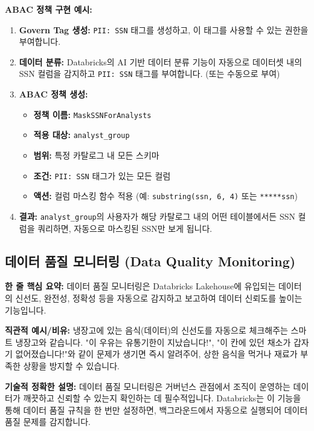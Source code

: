 \documentclass[11pt,a4paper]{article}
\begin{document}
\begin{examplebox}
\textbf{ABAC 정책 구현 예시:}
\begin{enumerate}
    \item \textbf{Govern Tag 생성:} \texttt{PII: SSN} 태그를 생성하고, 이 태그를 사용할 수 있는 권한을 부여합니다.
    \item \textbf{데이터 분류:} Databricks의 AI 기반 데이터 분류 기능이 자동으로 데이터셋 내의 SSN 컬럼을 감지하고 \texttt{PII: SSN} 태그를 부여합니다. (또는 수동으로 부여)
    \item \textbf{ABAC 정책 생성:}
    \begin{itemize}
        \item \textbf{정책 이름:} \texttt{MaskSSNForAnalysts}
        \item \textbf{적용 대상:} \texttt{analyst\_group}
        \item \textbf{범위:} 특정 카탈로그 내 모든 스키마
        \item \textbf{조건:} \texttt{PII: SSN} 태그가 있는 모든 컬럼
        \item \textbf{액션:} 컬럼 마스킹 함수 적용 (예: \texttt{substring(ssn, 6, 4)} 또는 \texttt{*****ssn})
    \end{itemize}
    \item \textbf{결과:} \texttt{analyst\_group}의 사용자가 해당 카탈로그 내의 어떤 테이블에서든 SSN 컬럼을 쿼리하면, 자동으로 마스킹된 SSN만 보게 됩니다.
\end{enumerate}
\end{examplebox}

\newpage
\subsection*{데이터 품질 모니터링 (Data Quality Monitoring)}

\begin{keyconceptbox}
\textbf{한 줄 핵심 요약:} 데이터 품질 모니터링은 Databricks Lakehouse에 유입되는 데이터의 신선도, 완전성, 정확성 등을 자동으로 감지하고 보고하여 데이터 신뢰도를 높이는 기능입니다.
\end{keyconceptbox}

\textbf{직관적 예시/비유:}
냉장고에 있는 음식(데이터)의 신선도를 자동으로 체크해주는 스마트 냉장고와 같습니다. "이 우유는 유통기한이 지났습니다!", "이 칸에 있던 채소가 갑자기 없어졌습니다!"와 같이 문제가 생기면 즉시 알려주어, 상한 음식을 먹거나 재료가 부족한 상황을 방지할 수 있습니다.

\textbf{기술적 정확한 설명:}
데이터 품질 모니터링은 거버넌스 관점에서 조직이 운영하는 데이터가 깨끗하고 신뢰할 수 있는지 확인하는 데 필수적입니다. Databricks는 이 기능을 통해 데이터 품질 규칙을 한 번만 설정하면, 백그라운드에서 자동으로 실행되어 데이터 품질 문제를 감지합니다.
\end{document}
